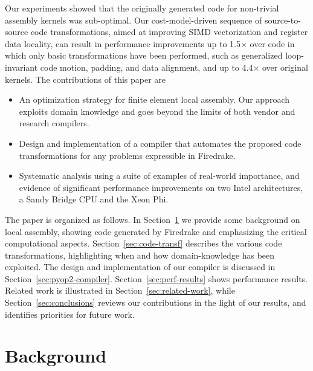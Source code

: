 \documentclass[conference]{IEEEtran}
\begin{document}
Our experiments showed that the originally generated code for non-trivial assembly kernels was sub-optimal. Our cost-model-driven sequence of source-to-source code transformations, aimed at improving SIMD vectorization and register data locality, can result in performance improvements up to 1.5$\times$ over code in which only basic transformations have been performed, such as generalized loop-invariant code motion, padding, and data alignment, and up to 4.4$\times$ over original kernels. The contributions of this paper are
\begin{itemize}
\item An optimization strategy for finite element local assembly. Our approach exploits domain knowledge and goes beyond the limits of both vendor and research compilers.
\item Design and implementation of a compiler that automates the proposed code transformations for any problems expressible in Firedrake.
\item Systematic analysis using a suite of examples of real-world importance, and evidence of significant performance improvements on two Intel architectures, a Sandy Bridge CPU and the Xeon Phi.
\end{itemize}

The paper is organized as follows. In Section~\ref{sec:background} we provide some background on local assembly, showing code generated by Firedrake and emphasizing the critical computational aspects. Section~\ref{sec:code-transf} describes the various code transformations, highlighting when and how domain-knowledge has been exploited. The design and implementation of our compiler is discussed in Section~\ref{sec:pyop2-compiler}. Section~\ref{sec:perf-results} shows performance results. Related work is illustrated in Section~\ref{sec:related-work}, while Section~\ref{sec:conclusions} reviews our contributions in the light of our results, and identifies priorities for future work.



\section{Background}
\label{sec:background}
\end{document}
